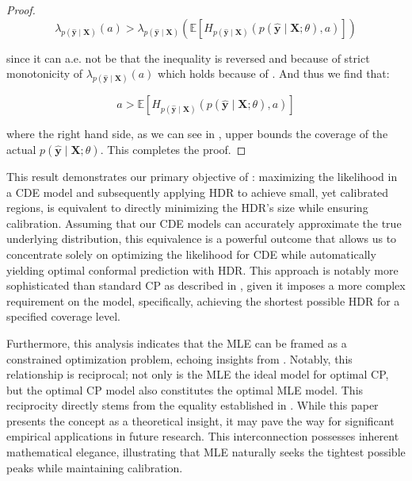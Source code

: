 \begin{proof}
    \begin{equation}
        \lambda_{p(\mathbf{\hat{y}}\mid\mathbf{X})}(a) > \lambda_{p(\mathbf{\hat{y}}\mid\mathbf{X})}\left(
        \mathbb{E}\left[H_{p(\hat{\mathbf{y}}\mid \mathbf{X})}(p(\mathbf{\hat{y}}\mid \mathbf{X};
            \theta), a)
            \right] \right)
    \end{equation}

    since it can a.e. not be that the inequality is reversed and because of strict monotonicity of $\lambda_{p(\mathbf{\hat{y}}\mid\mathbf{X})}(a)$ which holds because of . And thus we find that:

    \begin{equation}
        a > \mathbb{E}\left[H_{p(\hat{\mathbf{y}}\mid \mathbf{X})}(p(\mathbf{\hat{y}}\mid \mathbf{X};\theta), a)\right]
    \end{equation}

    where the right hand side, as we can see in , upper bounds the coverage of the actual $p(\mathbf{\hat{y}}\mid \mathbf{X};\theta)$. This completes the proof.

\end{proof}
This result demonstrates our primary objective of : maximizing the likelihood in a CDE model and subsequently applying HDR to achieve small, yet calibrated regions, is equivalent to directly minimizing the HDR's size while ensuring calibration. Assuming that our CDE models can accurately approximate the true underlying distribution, this equivalence is a powerful outcome that allows us to concentrate solely on optimizing the likelihood for CDE while automatically yielding optimal conformal prediction with HDR. This approach is notably more sophisticated than standard CP as described in , given it imposes a more complex requirement on the model, specifically, achieving the shortest possible HDR for a specified coverage level.

Furthermore, this analysis indicates that the MLE can be framed as a constrained optimization problem, echoing insights from \cite{chung2021beyond}. Notably, this relationship is reciprocal; not only is the MLE the ideal model for optimal CP, but the optimal CP model also constitutes the optimal MLE model. This reciprocity directly stems from the equality established in . While this paper presents the concept as a theoretical insight, it may pave the way for significant empirical applications in future research. This interconnection possesses inherent mathematical elegance, illustrating that MLE naturally seeks the tightest possible peaks while maintaining calibration.

